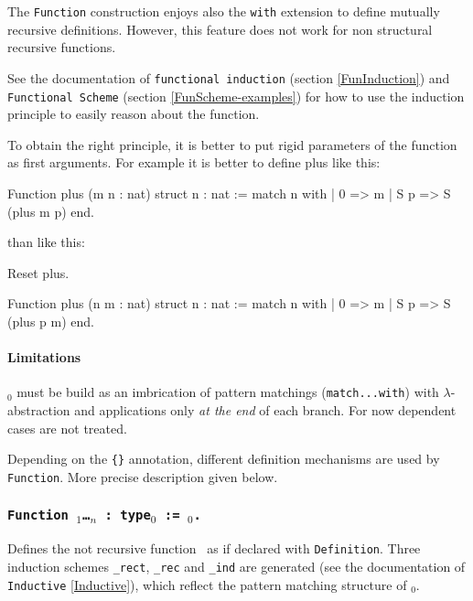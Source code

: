 The {\tt Function} construction enjoys also the {\tt with} extension
to define mutually recursive definitions. However, this feature does
not work for non structural recursive functions. %

See the documentation of {\tt functional induction} (section
\ref{FunInduction}) and {\tt Functional Scheme} (section
\ref{FunScheme-examples}) for how to use the induction principle to
easily reason about the function.

 To obtain the right principle, it is better
to put rigid parameters of the function as first arguments. For
example it is better to define plus like this:

\begin{coq_example*}
Function plus (m n : nat) {struct n} : nat :=
  match n with
  | 0 => m
  | S p => S (plus m p)
  end.
\end{coq_example*}
\noindent than like this:
\begin{coq_eval}
Reset plus.
\end{coq_eval}
\begin{coq_example*}
Function plus (n m : nat) {struct n} : nat :=
  match n with
  | 0 => m
  | S p => S (plus p m)
  end.
\end{coq_example*}

\paragraph{Limitations}
\label{sec:Function-limitations}
\term$_0$ must be build as an imbrication of pattern matchings
(\texttt{match...with}) with $\lambda$-abstraction and applications only
\emph{at the end} of each branch.
For now dependent cases are not treated.

\SeeAlso{\ref{FunScheme},\ref{FunScheme-examples},\ref{FunInduction}}

Depending on the {\tt \{\}} annotation, different definition
mechanisms are used by {\tt Function}. More precise description
given below.

\subsubsection{\tt Function {\ident} {\binder$_1$}\ldots{\binder$_n$}
 : type$_0$ := \term$_0$.
}

Defines  the  not  recursive  function  \ident\ as  if  declared  with
\texttt{Definition}.    Three  induction   schemes  {\tt\ident\_rect},
{\tt\ident\_rec}   and  {\tt\ident\_ind}   are   generated  (see   the
documentation of {\tt  Inductive} \ref{Inductive}), which reflect the
pattern matching structure of \term$_0$.


